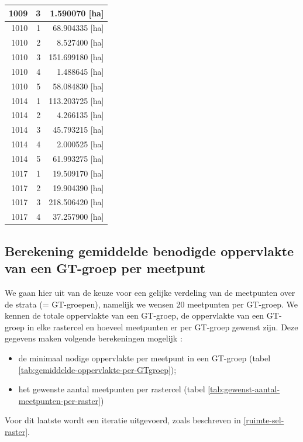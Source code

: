 \documentclass[11pt,]{book}
\providecommand{\tightlist}{%
  \setlength{\itemsep}{0pt}\setlength{\parskip}{0pt}}
\begin{document}
\begin{table}
\begin{tabular}[t]{r|r|r}
\hline
1009 & 3 & 1.590070 [ha]\\
\hline
1010 & 1 & 68.904335 [ha]\\
\hline
1010 & 2 & 8.527400 [ha]\\
\hline
1010 & 3 & 151.699180 [ha]\\
\hline
1010 & 4 & 1.488645 [ha]\\
\hline
1010 & 5 & 58.084830 [ha]\\
\hline
1014 & 1 & 113.203725 [ha]\\
\hline
1014 & 2 & 4.266135 [ha]\\
\hline
1014 & 3 & 45.793215 [ha]\\
\hline
1014 & 4 & 2.000525 [ha]\\
\hline
1014 & 5 & 61.993275 [ha]\\
\hline
1017 & 1 & 19.509170 [ha]\\
\hline
1017 & 2 & 19.904390 [ha]\\
\hline
1017 & 3 & 218.506420 [ha]\\
\hline
1017 & 4 & 37.257900 [ha]\\
\hline
\end{tabular}
\end{table}

\subsection{Berekening gemiddelde benodigde oppervlakte van een GT-groep
per
meetpunt}\label{berekening-gemiddelde-benodigde-oppervlakte-van-een-gt-groep-per-meetpunt}

We gaan hier uit van de keuze voor een gelijke verdeling van de
meetpunten over de strata (= GT-groepen), namelijk we wensen 20
meetpunten per GT-groep. We kennen de totale oppervlakte van een
GT-groep, de oppervlakte van een GT-groep in elke rastercel en hoeveel
meetpunten er per GT-groep gewenst zijn. Deze gegevens maken volgende
berekeningen mogelijk :

\begin{itemize}
\tightlist
\item
  de minimaal nodige oppervlakte per meetpunt in een GT-groep (tabel
  \ref{tab:gemiddelde-oppervlakte-per-GTgroep});
\item
  het gewenste aantal meetpunten per rastercel (tabel
  \ref{tab:gewenst-aantal-meetpunten-per-raster})
\end{itemize}

Voor dit laatste wordt een iteratie uitgevoerd, zoals beschreven in
\ref{ruimte-sel-raster}.
\end{document}
